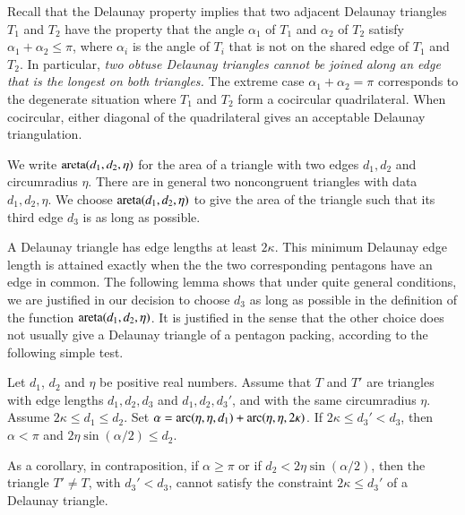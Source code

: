 \begin{remark}
  Recall that the Delaunay property implies that two adjacent Delaunay
  triangles $T_1$ and $T_2$ have the property that the angle
  $\alpha_1$ of $T_1$ and $\alpha_2$ of $T_2$ satisfy $\alpha_1 +
  \alpha_2\le \pi$, where $\alpha_i$ is the angle of $T_i$ that is not
  on the shared edge of $T_1$ and $T_2$.  In particular, {\it two
    obtuse Delaunay triangles cannot be joined along an edge that is
    the longest on both triangles.}  The extreme case
  $\alpha_1+\alpha_2=\pi$ corresponds to the degenerate situation
  where $T_1$ and $T_2$ form a cocircular quadrilateral. When
  cocircular, either diagonal of the quadrilateral gives an acceptable
  Delaunay triangulation.
\end{remark}



We write
${\operatorname{areta}}(d_1,d_2,\eta)$ for the area of a triangle with two edges
$d_1,d_2$ and circumradius $\eta$.  There are in general two
noncongruent triangles with data $d_1,d_2,\eta$.  We choose
${\operatorname{areta}}(d_1,d_2,\eta)$ to give the area of the triangle such that its
third edge $d_3$ is as long as possible.

A Delaunay triangle has edge lengths at least $2\kappa$.  This minimum
Delaunay edge length is attained exactly when the the two
corresponding pentagons have an edge in common.  The following lemma
shows that under quite general conditions, we are justified in our
decision to choose $d_3$ as long as possible in the definition of the
function ${\operatorname{areta}}(d_1,d_2,\eta)$.  It is justified in the sense that
the other choice does not usually give a Delaunay triangle of a
pentagon packing, according to the following simple test.

\begin{lemma}  
  Let $d_1$, $d_2$ and $\eta$ be positive real numbers.  Assume that
  $T$ and $T'$ are triangles with edge lengths $d_1,d_2,d_3$ and
  $d_1,d_2,d_3'$, and with the same circumradius $\eta$. Assume
  $2\kappa\le d_1\le d_2$.  Set $\alpha =
  \operatorname{arc}(\eta,\eta,d_1)+\operatorname{arc}(\eta,\eta,2\kappa)$.  If $2\kappa \le d_3'
  < d_3$, then $\alpha < \pi$ and $2\eta\sin(\alpha/2) \le d_2$.
\end{lemma}

As a corollary, 
in contraposition, if $\alpha\ge\pi$ or if $d_2 < 2\eta\sin(\alpha/2)$,
then the triangle $T'\ne T$, with $d_3' < d_3$,
cannot satisfy the constraint $2\kappa\le d_3'$ of a  Delaunay triangle.


